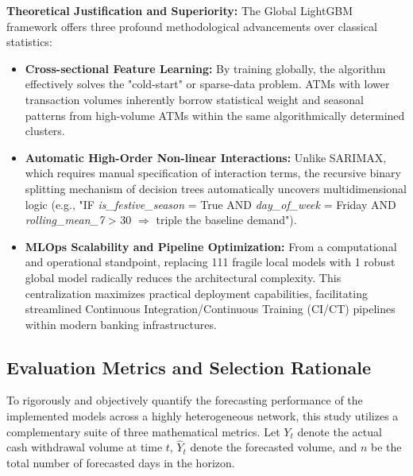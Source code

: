 \documentclass[conference, 12pt, onecolumn]{IEEEtran}
\begin{document}
\textbf{Theoretical Justification and Superiority:} The Global LightGBM framework offers three profound methodological advancements over classical statistics:
\begin{itemize}
    \item \textbf{Cross-sectional Feature Learning:} By training globally, the algorithm effectively solves the "cold-start" or sparse-data problem. ATMs with lower transaction volumes inherently borrow statistical weight and seasonal patterns from high-volume ATMs within the same algorithmically determined clusters.
    \item \textbf{Automatic High-Order Non-linear Interactions:} Unlike SARIMAX, which requires manual specification of interaction terms, the recursive binary splitting mechanism of decision trees automatically uncovers multidimensional logic (e.g., "IF \textit{is\_festive\_season} = True AND \textit{day\_of\_week} = Friday AND \textit{rolling\_mean\_7} > 30 $\Rightarrow$ triple the baseline demand").
    \item \textbf{MLOps Scalability and Pipeline Optimization:} From a computational and operational standpoint, replacing 111 fragile local models with 1 robust global model radically reduces the architectural complexity. This centralization maximizes practical deployment capabilities, facilitating streamlined Continuous Integration/Continuous Training (CI/CT) pipelines within modern banking infrastructures.
\end{itemize}

\subsection{Evaluation Metrics and Selection Rationale}
To rigorously and objectively quantify the forecasting performance of the implemented models across a highly heterogeneous network, this study utilizes a complementary suite of three mathematical metrics. Let $Y_t$ denote the actual cash withdrawal volume at time $t$, $\hat{Y}_t$ denote the forecasted volume, and $n$ be the total number of forecasted days in the horizon.
\end{document}
